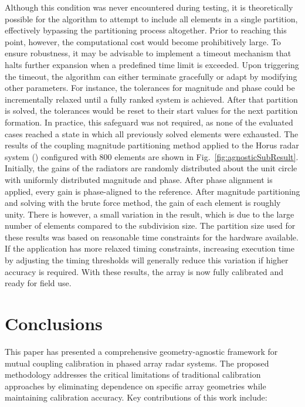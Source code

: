 \documentclass[journal]{IEEEtran}
\begin{document}
Although this condition was never encountered during testing, it is theoretically possible for the algorithm to attempt to include all elements in a single partition, effectively bypassing the partitioning process altogether. Prior to reaching this point, however, the computational cost would become prohibitively large. To ensure robustness, it may be advisable to implement a timeout mechanism that halts further expansion when a predefined time limit is exceeded. Upon triggering the timeout, the algorithm can either terminate gracefully or adapt by modifying other parameters. For instance, the tolerances for magnitude and phase could be incrementally relaxed until a fully ranked system is achieved. After that partition is solved, the tolerances would be reset to their start values for the next partition formation. In practice, this safeguard was not required, as none of the evaluated cases reached a state in which all previously solved elements were exhausted. The results of the coupling magnitude partitioning method applied to the Horus radar system (\cite{horuscal,horusgeneral}) configured with 800 elements are shown in Fig.~\ref{fig:agnosticSubResult}. Initially, the gains of the radiators are randomly distributed about the unit circle with uniformly distributed magnitude and phase. After phase alignment is applied, every gain is phase-aligned to the reference. After magnitude partitioning and solving with the brute force method, the gain of each element is roughly unity. There is however, a small variation in the result, which is due to the large number of elements compared to the subdivision size. The partition size used for these results was based on reasonable time constraints for the hardware available. If the application has more relaxed timing constraints, increasing execution time by adjusting the timing thresholds will generally reduce this variation if higher accuracy is required.
With these results, the array is now fully calibrated and ready for field use.



\section{Conclusions}

This paper has presented a comprehensive geometry-agnostic framework for mutual coupling calibration in phased array radar systems. The proposed methodology addresses the critical limitations of traditional calibration approaches by eliminating dependence on specific array geometries while maintaining calibration accuracy. Key contributions of this work include:
\end{document}
